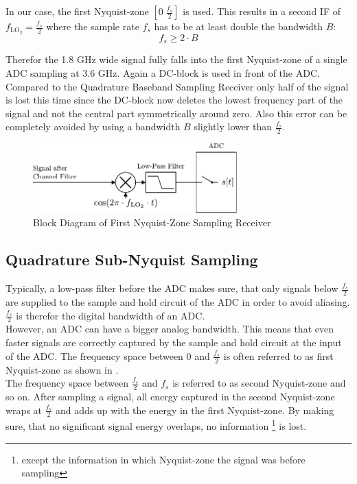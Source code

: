 In our case, the first Nyquist-zone $[0 \; \frac{f_s}{2}]$ is used.
This results in a second \gls{IF} of $f_{\text{LO}_2} = \frac{f_s}{2}$ where
the sample rate $f_s$ has to be at least double the bandwidth $B$:
\[f_s \geq 2 \cdot B\]

Therefor the 1.8 GHz wide signal fully falls into the first Nyquist-zone of
a single \gls{ADC} sampling at 3.6 GHz. Again a \gls{DC}-block
is used in front of the \gls{ADC}. Compared to the Quadrature Baseband
Sampling Receiver only half of the signal is lost this time since
the \gls{DC}-block now deletes the lowest frequency part of the signal
and not the central part symmetrically around zero. Also this error
can be completely avoided by using a bandwidth $B$ slightly lower than
$\frac{f_s}{2}$. \\

\begin{figure}[p]
  \centering
  \includegraphics[width=0.7\textwidth]{figures/rx_adc_0_bd}
  \caption{Block Diagram of First Nyquist-Zone Sampling Receiver}
  \label{fig:rx_adc_0_bd}
\end{figure}

\subsection{Quadrature Sub-Nyquist Sampling}
\label{sec:rx_adc_2}
Typically, a low-pass filter before the \gls{ADC} makes sure, that only
signals below $\frac{f_s}{2}$ are supplied to the sample and hold circuit
of the \gls{ADC} in order to avoid aliasing.
$\frac{f_s}{2}$ is therefor the digital bandwidth of an \gls{ADC}. \\

However, an \gls{ADC} can have a bigger analog bandwidth. This means that
even faster signals are correctly captured by the sample and hold circuit
at the input of the \gls{ADC}. The frequency space between 0 and
$\frac{f_s}{2}$ is often referred to as first Nyquist-zone as shown in
. \\
The frequency space between $\frac{f_s}{2}$ and $f_s$ is referred to as
second Nyquist-zone and so on. After sampling a signal, all energy captured
in the second Nyquist-zone wraps at $\frac{f_s}{2}$ and adds up with the energy
in the first Nyquist-zone.
By making sure, that no significant signal energy overlaps, no information%
\footnote{except the information in which Nyquist-zone the signal was before
  sampling} is lost. \\

